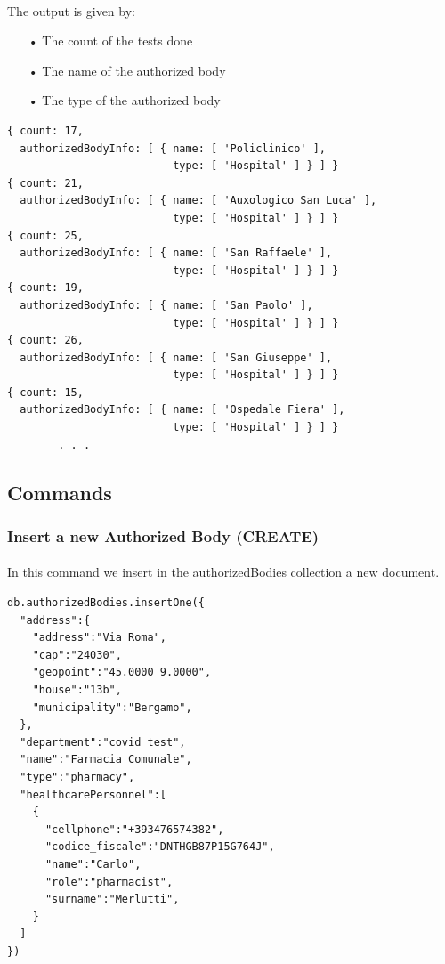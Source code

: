 \documentclass[a4paper,12pt]{article}
\begin{document}
\paragraph{} The output is given by: 
\begin{itemize}[noitemsep]
\item[•] The count of the tests done
\item[•] The name of the authorized body
\item[•] The type of the authorized body
\end{itemize}

\begin{tcolorbox}[colback=red!5!white,colframe=red!75!black,title=OUTPUT]
\begin{verbatim}
{ count: 17,
  authorizedBodyInfo: [ { name: [ 'Policlinico' ],
                          type: [ 'Hospital' ] } ] }
{ count: 21,
  authorizedBodyInfo: [ { name: [ 'Auxologico San Luca' ], 
                          type: [ 'Hospital' ] } ] }
{ count: 25,
  authorizedBodyInfo: [ { name: [ 'San Raffaele' ],
                          type: [ 'Hospital' ] } ] }
{ count: 19,
  authorizedBodyInfo: [ { name: [ 'San Paolo' ], 
                          type: [ 'Hospital' ] } ] }
{ count: 26,
  authorizedBodyInfo: [ { name: [ 'San Giuseppe' ], 
                          type: [ 'Hospital' ] } ] }
{ count: 15,
  authorizedBodyInfo: [ { name: [ 'Ospedale Fiera' ], 
                          type: [ 'Hospital' ] } ] }
        . . .
\end{verbatim}
\end{tcolorbox}


\subsection{Commands}
\subsubsection{Insert a new Authorized Body (CREATE)}
\paragraph{} In this command we insert in the authorizedBodies collection a new document.

\begin{tcolorbox}[colback=orange!5!white,colframe=orange!75!black,title=COMMAND]
\begin{verbatim}
db.authorizedBodies.insertOne({
  "address":{
    "address":"Via Roma",
    "cap":"24030",
    "geopoint":"45.0000 9.0000",
    "house":"13b",
    "municipality":"Bergamo",
  },
  "department":"covid test",
  "name":"Farmacia Comunale",
  "type":"pharmacy",
  "healthcarePersonnel":[
    {
      "cellphone":"+393476574382",
      "codice_fiscale":"DNTHGB87P15G764J",
      "name":"Carlo",
      "role":"pharmacist",
      "surname":"Merlutti",
    }
  ]
})
\end{verbatim}
\end{tcolorbox}
\end{document}
